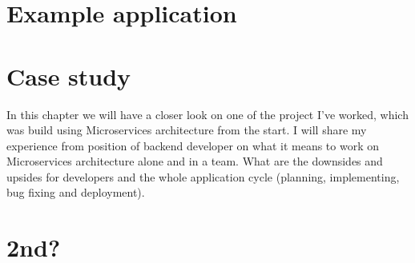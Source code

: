 





\chapter{Example application}


\chapter{Case study}
\label{chapter:personal_experience}
In this chapter we will have a closer look on one of the project I've worked, which was build using Microservices architecture from the start. I will share my experience from position of backend developer on what it means to work on Microservices architecture alone and in a team. What are the downsides and upsides for developers and the whole application cycle (planning, implementing, bug fixing and deployment).



\chapter{2nd?}

